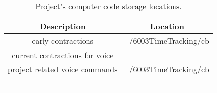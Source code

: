 \begin{table}
    \centering
    \begin{tabular}{cc}
        Description & Location\\
        \toprule
         early contractions & ~/6003TimeTracking/cb\\
         current contractions for voice & \\
         project related voice commands &  ~/6003TimeTracking/cb\\
         
         & \\
         & \\
         & \\
         & \\
         \bottomrule
    \end{tabular}
    \caption{Project's computer code storage locations.}
    \label{tab:my_label}
\end{table}

